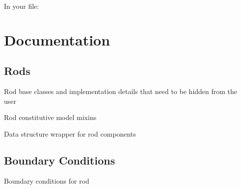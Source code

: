 \documentclass[letterpaper,10pt,english]{sphinxmanual}
\begin{document}
In your  file:


\section{Documentation}
\label{\detokenize{documentation:documentation}}\label{\detokenize{documentation::doc}}

\subsection{Rods}
\label{\detokenize{documentation:module-elastica.rod.cosserat_rod}}\label{\detokenize{documentation:rods}}
Rod base classes and implementation details that need to be hidden from the user

\begin{fulllineitems}
\label{\detokenize{documentation:elastica.rod.cosserat_rod.CosseratRod}}
\end{fulllineitems}

\label{\detokenize{documentation:module-elastica.rod.constitutive_model}}
Rod constitutive model mixins

\label{\detokenize{documentation:module-elastica.rod.data_structures}}
Data structure wrapper for rod components


\subsection{Boundary Conditions}
\label{\detokenize{documentation:module-elastica.boundary_conditions}}\label{\detokenize{documentation:boundary-conditions}}
Boundary conditions for rod
\end{document}
